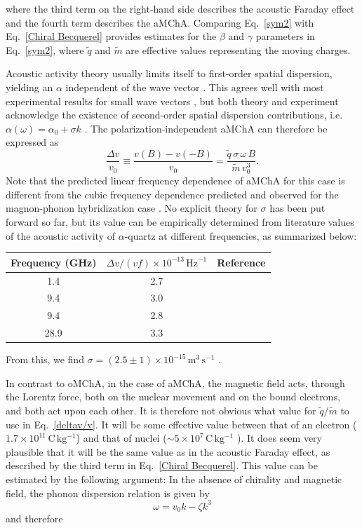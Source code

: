 \documentclass[prl,twocolumn]{revtex4-2}
\begin{document}
where the third term on the right-hand side describes the acoustic Faraday
effect and the fourth term describes the aMChA. Comparing Eq.~\eqref{sym2}
with Eq.~\eqref{Chiral Becquerel} provides estimates for the $\beta$ and $
\gamma$ parameters in Eq.~\eqref{sym2}, where $\widetilde{q}$ and $
\widetilde{m}$ are effective values representing the moving charges.

Acoustic activity theory usually limits itself to first-order spatial
dispersion, yielding an $\alpha$ independent of the wave vector \cite
{Portigal-Burstein}. This agrees well with most experimental results for
small wave vectors \cite{Shen}, but both theory and experiment acknowledge
the existence of second-order spatial dispersion contributions, i.e. $
\alpha(\omega)=\alpha_{0}+\sigma k$ \cite{Shen}. The
polarization-independent aMChA can therefore be expressed as
\begin{equation}
\frac{\Delta v}{v_{0}}\equiv \frac{v(B)-v(-B)}{v_{0}}=\frac{\widetilde{q}
\,\sigma\,\omega\, B}{\widetilde{m}\,v_{0}^{3}}.  \label{deltav/v}
\end{equation}
Note that the predicted linear frequency dependence of aMChA for this case
is different from the cubic frequency dependence predicted and observed for
the magnon-phonon hybridization case \cite{USMChA1,USMChA2}. No explicit
theory for $\sigma$ has been put forward so far, but its value can be
empirically determined from literature values of the acoustic activity of $
\alpha$-quartz at different frequencies, as summarized below:

\begin{center}
\begin{tabular}{|c|c|c|}
\hline
Frequency (GHz) & $\Delta v/(v f)\times 10^{-13}\,\mathrm{Hz}^{-1}$ &
Reference \\ \hline
1.4 & 2.7 & \cite{Pine} \\
9.4 & 3.0 & \cite{Joffrin} \\
9.4 & 2.8 & \cite{Bialas} \\
28.9 & 3.3 & \cite{Pine} \\ \hline
\end{tabular}
\end{center}

From this, we find $\sigma = (2.5 \pm 1)\times 10^{-15}\,\mathrm{
m^{3}\,s^{-1}}$ \cite{Sup-mat}.

In contrast to oMChA, in the case of aMChA, the magnetic field acts, through
the Lorentz force, both on the nuclear movement and on the bound electrons,
and both act upon each other. It is therefore not obvious what value for $
\widetilde{q}/\widetilde{m}$ to use in Eq.~\eqref{deltav/v}. It will be some
effective value between that of an electron ($1.7\times 10^{11}\,\mathrm{
C\,kg^{-1}}$) and that of nuclei ($\sim 5\times 10^{7}\,\mathrm{C\,kg^{-1}}$
). It does seem very plausible that it will be the same value as in the
acoustic Faraday effect, as described by the third term in Eq.~\eqref{Chiral
Becquerel}. This value can be estimated by the following argument: In the
absence of chirality and magnetic field, the phonon dispersion relation is
given by
\begin{equation}
\omega = v_{0}k - \zeta k^{3}
\end{equation}
and therefore
\end{document}

